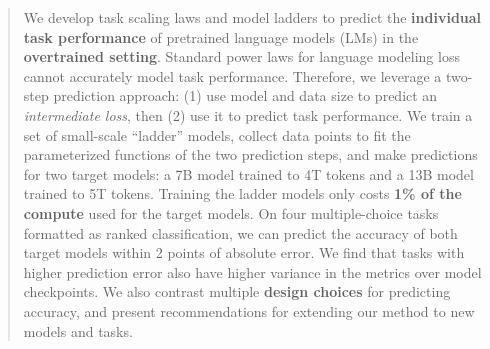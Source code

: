 \begin{abstract}
We develop task scaling laws and model ladders to predict the \textbf{individual task performance} of pretrained language models (LMs) in the \textbf{overtrained setting}. 
Standard power laws for language modeling loss cannot accurately model task performance.
Therefore, we leverage a two-step prediction approach: (1) use model and data size to predict an \textit{intermediate loss}, then (2) use it to predict task performance.
We train a set of small-scale ``ladder'' models, collect data points to fit the parameterized functions of the two prediction steps, and make predictions for two target models: a 7B model trained to 4T tokens and a 13B model trained to 5T tokens.
Training the ladder models only costs \textbf{1\% of the compute} used for the target models.
On four multiple-choice tasks formatted as ranked classification, we can predict the accuracy of both target models within 2 points of absolute error. We find that tasks with higher prediction error also have higher variance in the metrics over model checkpoints. We also contrast multiple \textbf{design choices} for predicting accuracy, and present recommendations for extending our method to new models and tasks.
\end{abstract}
\vspace{-10pt}

